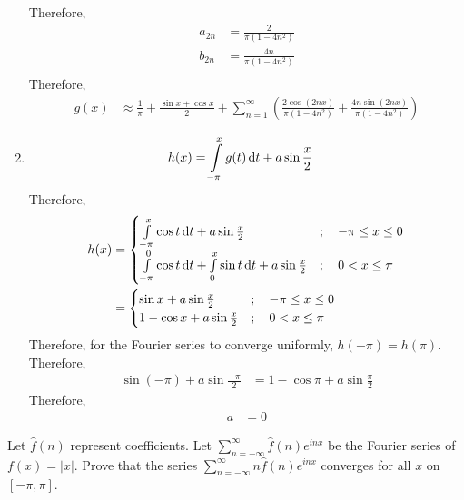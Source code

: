 \documentclass[fleqn, a4paper, 11pt, oneside]{amsart}
\theoremstyle{definition}
\theoremstyle{theorem}
\begin{document}
\begin{solution}
\begin{enumerate}[leftmargin=*]
			Therefore,
			\begin{align*}
				a_{2 n} & = \frac{2}{\pi \left( 1 - 4 n^2 \right)}   \\
				b_{2 n} & = \frac{4 n}{\pi \left( 1 - 4 n^2 \right)} \\
			\end{align*}
			Therefore,
			\begin{align*}
				g(x) & \approx \frac{1}{\pi} + \frac{\sin x + \cos x}{2} + \sum\limits_{n = 1}^{\infty} \left( \frac{2 \cos(2 n x)}{\pi \left( 1 - 4 n^2 \right)} + \frac{4 n \sin(2 n x)}{\pi \left( 1 - 4 n^2 \right)} \right)
			\end{align*}
		\item
			\begin{align*}
				h(x) &= \int\limits_{-\pi}^{x} g(t) \dif t + a \sin \frac{x}{2}
			\end{align*}
			Therefore,
			\begin{align*}
				h(x) &=
					\begin{cases}
						\int\limits_{-\pi}^{x} \cos t \dif t + a \sin \frac{x}{2}                                     & ;\quad -\pi \le x \le 0 \\
						\int\limits_{-\pi}^{0} \cos t \dif t + \int\limits_{0}^{x} \sin t \dif t + a \sin \frac{x}{2} & ;\quad 0 < x \le \pi    \\
					\end{cases}\\
				&=
					\begin{cases}
						\sin x + a \sin \frac{x}{2}     & ;\quad -\pi \le x \le 0 \\
						1 - \cos x + a \sin \frac{x}{2} & ;\quad 0 < x \le \pi    \\
					\end{cases}
			\end{align*}
			Therefore, for the Fourier series to converge uniformly, $h(-\pi) = h(\pi)$.\\
			Therefore,
			\begin{align*}
				\sin(-\pi) + a \sin \frac{-\pi}{2} & = 1 - \cos \pi + a \sin \frac{\pi}{2}
			\end{align*}
			Therefore,
			\begin{align*}
				a & = 0
			\end{align*}
	\end{enumerate}
\end{solution}

\begin{question}
	Let $\hat{f}(n)$ represent coefficients.
	Let $\sum\limits_{n = -\infty}^{\infty} \hat{f}(n) e^{i n x}$ be the Fourier series of $f(x) = |x|$.
	Prove that the series $\sum\limits_{n = -\infty}^{\infty} n \hat{f}(n) e^{i n x}$ converges for all $x$ on $[-\pi,\pi]$.
\end{question}
\end{document}
